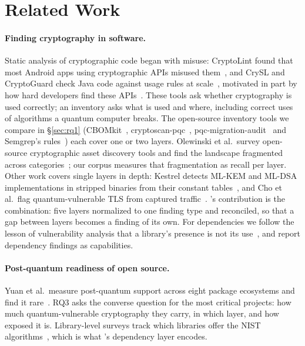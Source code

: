\section{Related Work}
\label{sec:related}

\paragraph{Finding cryptography in software.} Static analysis of
cryptographic code began with misuse: CryptoLint found that most Android apps
using cryptographic APIs misused them~\cite{egele2013}, and CrySL and
CryptoGuard check Java code against usage rules at scale~\cite{kruger2021crysl,
rahaman2019}, motivated in part by how hard developers find these
APIs~\cite{nadi2016}. These tools ask whether cryptography is used
correctly; an inventory asks what is used and where, including correct uses of
algorithms a quantum computer breaks. The open-source inventory tools we
compare in \S\ref{sec:rq1} (CBOMkit~\cite{cbomkit},
cryptoscan-pqc~\cite{cryptoscanpqc}, pqc-migration-audit~\cite{pqcaudit} and
Semgrep's rules~\cite{semgrep}) each cover one or two layers.
Olewinski et al.\ survey open-source cryptographic asset discovery tools and
find the landscape fragmented across categories~\cite{olewinski2026}; our
corpus measures that fragmentation as recall per layer. Other work covers
single layers in depth: Kestrel detects ML-KEM and ML-DSA implementations in
stripped binaries from their constant tables~\cite{junaid2026}, and Cho et al.\
flag quantum-vulnerable TLS from captured traffic~\cite{cho2026}. \tool{}'s
contribution is the combination: five layers normalized to one finding type
and reconciled, so that a gap between layers becomes a finding of its own.
For dependencies we follow the lesson of vulnerability analysis that a
library's presence is not its use~\cite{ponta2018}, and report dependency
findings as capabilities.

\paragraph{Post-quantum readiness of open source.} Yuan et al.\ measure
post-quantum support across eight package ecosystems and find it
rare~\cite{yuan2026}. RQ3 asks the converse question for the most critical
projects: how much quantum-vulnerable cryptography they carry, in which
layer, and how exposed it is. Library-level surveys track which libraries
offer the NIST algorithms~\cite{ahmed2025}, which is what \tool{}'s
dependency layer encodes.

